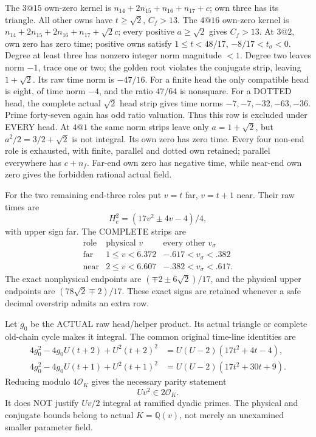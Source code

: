\documentclass[11pt]{article}
\begin{document}
The \(3@15\) own-zero kernel is
\(n_{14}+2n_{15}+n_{16}+n_{17}+c\);
own three has its triangle.
All other owns have \(t\ge\sqrt2\), \(C_f>13\).
The \(4@16\) own-zero kernel is
\(n_{14}+2n_{15}+2n_{16}+n_{17}+\sqrt2c\);
every positive \(a\ge\sqrt2\) gives \(C_f>13\).
At \(3@2\), own zero has zero time; positive
owns satisfy
\(1\le t<48/17\), \(-8/17<t_\sigma<0\).
Degree at least three has nonzero integer norm
magnitude \(<1\).
Degree two leaves norm \(-1\), trace one or two;
the golden root violates the conjugate strip,
leaving \(1+\sqrt2\).
Its raw time norm is \(-47/16\).
For a finite head the only compatible head is
eight, of time norm \(-4\), and the ratio
\(47/64\) is nonsquare.
For a DOTTED head, the complete actual
\(\sqrt2\) head strip gives time norms
\(-7,-7,-32,-63,-36\).
Prime forty-seven again has odd ratio valuation.
Thus this row is excluded under EVERY head.
At \(4@1\) the same norm strips leave only
\(a=1+\sqrt2\), but \(a^2/2=3/2+\sqrt2\)
is not integral.
Its own zero has zero time.
Every four non-end role is exhausted, with
finite, parallel and dotted own retained;
parallel everywhere has \(c+n_f\).
Far-end own zero has negative time, while
near-end own zero gives the forbidden rational
actual field.

For the two remaining end-three roles put
\(v=t\) far, \(v=t+1\) near.
Their raw times are
\[
 H_c^2=(17v^2\pm4v-4)/4,
\]
with upper sign far.
The COMPLETE strips are
\[
\begin{array}{c|c|c}
 \text{role}&\text{physical }v&\text{every other }v_\sigma\\ \hline
 \text{far}&1\le v<6.372&-.617<v_\sigma<.382\\
 \text{near}&2\le v<6.607&-.382<v_\sigma<.617 .
\end{array}
\]
The exact nonphysical endpoints are
\((\mp2\pm6\sqrt2)/17\), and the physical
upper endpoints are
\((78\sqrt2\mp2)/17\).
These exact signs are retained whenever a
safe decimal overstrip admits an extra row.

Let \(g_0\) be the ACTUAL raw head/helper
product.
Its actual triangle or complete old-chain
cycle makes it integral.
The common original time-line identities are
\[
 \begin{split}
 4g_0^2-4g_0U(t+2)+U^2(t+2)^2
                  &=U(U-2)(17t^2+4t-4),\\
 4g_0^2-4g_0U(t+1)+U^2(t+1)^2
                  &=U(U-2)(17t^2+30t+9).
 \end{split}
\]
Reducing modulo \(4\mathcal O_K\) gives the
necessary parity statement
\[
                              Uv^2\in2\mathcal O_K .
\tag{D17P}\label{eq:arithD17helperparity}
\]
It does NOT justify \(Uv/2\) integral at
ramified dyadic primes.
The physical and conjugate bounds belong to
actual \(K=\mathbb Q(v)\), not merely an
unexamined smaller parameter field.
\end{document}
